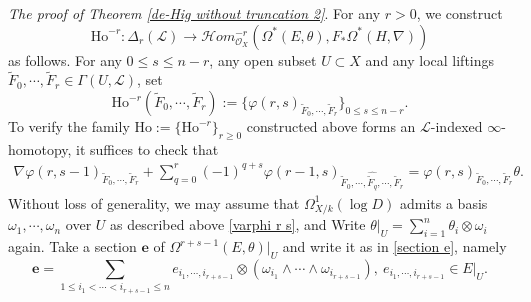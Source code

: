 \documentclass[12pt, a4paper]{article}
\begin{document}

\emph{The proof of Theorem \ref{de-Hig without truncation 2}}. For any $r>0$, we construct 
$$
\mathrm{Ho}^{-r}:\Delta_r(\mathcal L)\to \mathcal Hom^{-r}_{\mathcal{O}_X}(\Omega^*(E,\theta), F_*\Omega^*(H,\nabla))
$$
as follows. For any $0\leq s\leq n-r$, any open subset $U\subset X$ and any local liftings $\tilde F_0,\cdots,\tilde F_r\in\Gamma(U,\mathcal L)$, set
$$
\mathrm{Ho}^{-r}(\tilde F_0,\cdots,\tilde F_r):=\{\varphi(r,s)_{\tilde F_0,\cdots,\tilde F_r}\}_{0\leq s\leq n-r}.
$$
To verify the family $\mathrm{Ho}:=\{\mathrm{Ho}^{-r}\}_{r\geq0}$ constructed above forms an $\mathcal L$-indexed $\infty$-homotopy, it suffices to check that
\begin{eqnarray}\label{infty homotopy relation}
\nabla\varphi(r,s-1)_{\tilde F_0,\cdots,\tilde F_r}+\sum_{q=0}^r(-1)^{q+s}\varphi(r-1,s)_{\tilde F_0,\cdots,\widehat{\tilde F_q},\cdots,\tilde F_r}=\varphi(r,s)_{\tilde F_0,\cdots,\tilde F_r}\theta.
\end{eqnarray}
Without loss of generality, we may assume that $\Omega^1_{X/k}(\log D)$ admits a basis $\omega_1,\cdots,\omega_n$ over $U$ as described above \eqref{varphi r s}, and Write $\theta|_U=\sum_{i=1}^n\theta_i\otimes\omega_i$ again. Take a section $\boldsymbol{e}$ of $\Omega^{r+s-1}(E,\theta)|_U$ and write it as in \eqref{section e}, namely
$$
\boldsymbol{e}=\sum_{1\leq i_1<\cdots<i_{r+s-1}\leq n}e_{i_1,\cdots,i_{r+s-1}}\otimes(\omega_{i_1}\wedge\cdots\wedge\omega_{i_{r+s-1}}),~e_{i_1,\cdots,i_{r+s-1}}\in E|_U.
$$
\end{document}
